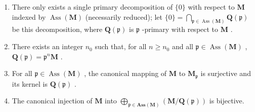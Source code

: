 \begin{enumerate}
\def\labelenumi{(\roman{enumi})}
\item
  There only exists a single primary decomposition of \(\{0\}\) with respect to \(\mathbf{M}\) indexed by \(\operatorname{Ass}(\mathbf{M})\) (necessarily reduced); let \(\{0\} = \bigcap_{\mathfrak{p} \in \operatorname{Ass}(\mathbf{M})} \mathbf{Q}(\mathfrak{p})\) be this decomposition, where \(\mathbf{Q}(\mathfrak{p})\) is \(\mathfrak{p}\) -primary with respect to \(\mathbf{M}\) .
\item
  There exists an integer \(n_0\) such that, for all \(n \geqslant n_0\) and all \(\mathfrak{p} \in \operatorname{Ass}(\mathbf{M})\) , \(\mathbf{Q}(\mathfrak{p}) = \mathfrak{p}^n\mathbf{M}\) .
\item
  For all \(\mathfrak{p} \in \operatorname{Ass}(\mathbf{M})\) , the canonical mapping of \(\mathbf{M}\) to \(\mathbf{M}_{\mathfrak{p}}\) is surjective and its kernel is \(\mathbf{Q}(\mathfrak{p})\) .
\item
  The canonical injection of \(\mathbf{M}\) into \(\bigoplus_{\mathfrak{p} \in \mathbf{Ass}(\mathbf{M})} (\mathbf{M} / \mathbf{Q}(\mathfrak{p}))\) is bijective.
\end{enumerate}

